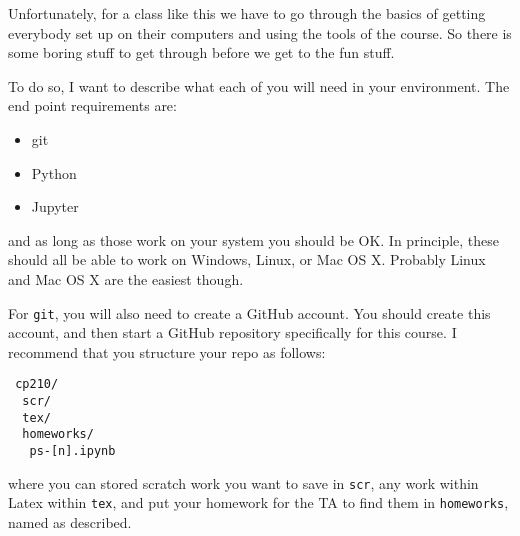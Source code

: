 Unfortunately, for a class like this we have to go through the basics
of getting everybody set up on their computers and using the tools of
the course. So there is some boring stuff to get through before we get
to the fun stuff. 

To do so, I want to describe what each of you will need in your
environment. The end point requirements are:
\begin{itemize}
\item git
\item Python
\item Jupyter
\end{itemize}
and as long as those work on your system you should be OK. In
principle, these should all be able to work on Windows, Linux, or Mac
OS X. Probably Linux and Mac OS X are the easiest though.

For {\tt git}, you will also need to create a GitHub account. You
should create this account, and then start a GitHub repository
specifically for this course. I recommend that you structure your repo
as follows:
\begin{verbatim}
 cp210/
  scr/
  tex/ 
  homeworks/
   ps-[n].ipynb
\end{verbatim}
where you can stored scratch work you want to save in {\tt scr}, any
work within Latex within {\tt tex}, and put your homework for the TA
to find them in {\tt homeworks}, named as described. 




